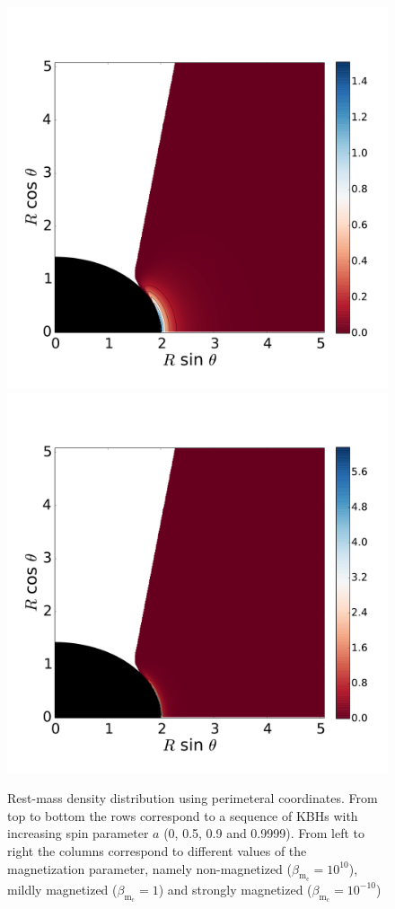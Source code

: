 \documentclass[twocolumn,aps,showpacs,showkeys,prd,superscriptaddress,byrevtex, amsmath]{revtex4-1}
\begin{document}
\begin{figure}
\hspace{-0.3cm}
\includegraphics[scale=0.14]{figures/fig10_09999_1.pdf}
\hspace{-0.2cm}
\includegraphics[scale=0.14]{figures/fig10_09999__10.pdf}
\hspace{-0.2cm}
\caption{Rest-mass density distribution using perimeteral coordinates. From top to bottom the rows correspond to a sequence of KBHs with increasing spin parameter $a$ (0, 0.5, 0.9 and 0.9999). From left to right the columns correspond to different values of the magnetization parameter, namely non-magnetized ($\beta_{\mathrm{m}_{\mathrm{c}}} = 10^{10}$), mildly magnetized ($\beta_{\mathrm{m}_{\mathrm{c}}} = 1$) and strongly magnetized ($\beta_{\mathrm{m}_{\mathrm{c}}} = 10^{-10}$)}
\label{models_Kerr_peri}
\end{figure}
\end{document}
